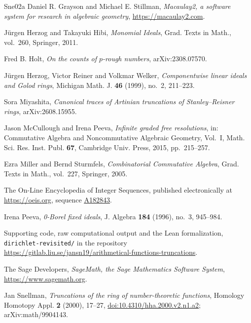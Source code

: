 \documentclass[a4paper,11pt,oneside,reqno]{amsart}
\theoremstyle{definition}
\theoremstyle{remark}
\theoremstyle{plain}
\newcommand{\seqnum}[1]{\href{https://oeis.org/#1}{\underline{#1}}}
\begin{document}
\begin{thebibliography}{Sne02a}
Daniel R. Grayson and Michael E. Stillman,
\emph{Macaulay2, a software system for research in algebraic geometry},
\url{https://macaulay2.com}.

Jürgen Herzog and Takayuki Hibi,
\emph{Monomial Ideals},
Grad. Texts in Math., vol.~260, Springer, 2011.

Fred B. Holt,
\emph{On the counts of \(p\)-rough numbers},
arXiv:2308.07570.

Jürgen Herzog, Victor Reiner and Volkmar Welker,
\emph{Componentwise linear ideals and Golod rings},
Michigan Math. J. \textbf{46} (1999), no.~2, 211--223.

Sora Miyashita,
\emph{Canonical traces of Artinian truncations of Stanley--Reisner rings},
arXiv:2608.15955.

Jason McCullough and Irena Peeva,
\emph{Infinite graded free resolutions},
in: Commutative Algebra and Noncommutative Algebraic Geometry, Vol.~I,
Math. Sci. Res. Inst. Publ. \textbf{67}, Cambridge Univ. Press, 2015,
pp.~215--257.

Ezra Miller and Bernd Sturmfels,
\emph{Combinatorial Commutative Algebra},
Grad. Texts in Math., vol.~227, Springer, 2005.

The On-Line Encyclopedia of Integer Sequences, published electronically at
\url{https://oeis.org}, sequence \seqnum{A182843}.

Irena Peeva,
\emph{0-Borel fixed ideals},
J. Algebra \textbf{184} (1996), no.~3, 945--984.

Supporting code, raw computational output and the Lean formalization,
\texttt{dirichlet-revisited/} in the repository
\url{https://gitlab.liu.se/jansn19/arithmetical-functions-truncations}.

The Sage Developers,
\emph{SageMath, the Sage Mathematics Software System},
\url{https://www.sagemath.org}.

Jan Snellman,
\emph{Truncations of the ring of number-theoretic functions},
Homology Homotopy Appl. \textbf{2} (2000), 17--27,
\href{https://doi.org/10.4310/hha.2000.v2.n1.a2}{doi:10.4310/hha.2000.v2.n1.a2};
arXiv:math/9904143.


\end{thebibliography}
\end{document}
